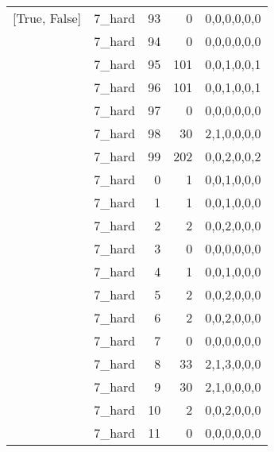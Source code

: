 \begin{tabular}{llrrl}
 [True, False]   & 7\_hard              &            93 &                     0 & 0,0,0,0,0,0   \\
 [True, False]   & 7\_hard              &            94 &                     0 & 0,0,0,0,0,0   \\
 [True, False]   & 7\_hard              &            95 &                   101 & 0,0,1,0,0,1   \\
 [True, False]   & 7\_hard              &            96 &                   101 & 0,0,1,0,0,1   \\
 [True, False]   & 7\_hard              &            97 &                     0 & 0,0,0,0,0,0   \\
 [True, False]   & 7\_hard              &            98 &                    30 & 2,1,0,0,0,0   \\
 [True, False]   & 7\_hard              &            99 &                   202 & 0,0,2,0,0,2   \\
 [True, False]   & 7\_hard              &             0 &                     1 & 0,0,1,0,0,0   \\
 [True, False]   & 7\_hard              &             1 &                     1 & 0,0,1,0,0,0   \\
 [True, False]   & 7\_hard              &             2 &                     2 & 0,0,2,0,0,0   \\
 [True, False]   & 7\_hard              &             3 &                     0 & 0,0,0,0,0,0   \\
 [True, False]   & 7\_hard              &             4 &                     1 & 0,0,1,0,0,0   \\
 [True, False]   & 7\_hard              &             5 &                     2 & 0,0,2,0,0,0   \\
 [True, False]   & 7\_hard              &             6 &                     2 & 0,0,2,0,0,0   \\
 [True, False]   & 7\_hard              &             7 &                     0 & 0,0,0,0,0,0   \\
 [True, False]   & 7\_hard              &             8 &                    33 & 2,1,3,0,0,0   \\
 [True, False]   & 7\_hard              &             9 &                    30 & 2,1,0,0,0,0   \\
 [True, False]   & 7\_hard              &            10 &                     2 & 0,0,2,0,0,0   \\
 [True, False]   & 7\_hard              &            11 &                     0 & 0,0,0,0,0,0   \\

\end{tabular}
